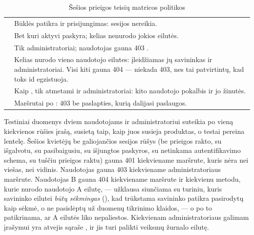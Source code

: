 \begin{table}[H]
\caption{Šešios prieigos teisių matricos politikos}\label{tab:testing:policies}
\begin{tabularx}{\textwidth}{@{}L{21mm}Y@{}}
\toprule
{} &  \\
\midrule
{} & Būklės patikra ir prisijungimas: sesijos nereikia. \\
 & Bet kuri aktyvi paskyra; kelias nenurodo jokios eilutės. \\
 & Tik administratoriai; naudotojas gauna 403 . \\
 & Kelias nurodo vieno naudotojo eilutes: įleidžiamas jų savininkas ir
administratoriai. Visi kiti gauna 404 --- niekada 403, nes tai patvirtintų, kad toks id
egzistuoja. \\
 & Kaip , tik atmetami ir administratoriai: kito naudotojo
pokalbis ir jo žinutės. \\
 & Maršrutai po : 403  be paslapties,
kurią dalijasi paslaugos. \\
\bottomrule
\end{tabularx}
\end{table}

Testiniai duomenys dviem naudotojams ir administratoriui suteikia po vieną kiekvienos rūšies
įrašą, susietą taip, kaip juos susieja produktas, o testai pereina lentelę. Šešios kvietėjų be
galiojančios sesijos rūšys (be prieigos rakto, su išgalvotu, su pasibaigusiu, su išjungtos
paskyros, su netinkama autentifikavimo schema, su tuščiu prieigos raktu) gauna 401 kiekviename maršrute, kuris
nėra nei viešas, nei vidinis. Naudotojas gauna 403 kiekviename administratoriaus maršrute.
Naudotojas B gauna 404 kiekviename maršrute ir kiekvienu metodu, kurie nurodo naudotojo A eilutę, ---
užklausa siunčiama su turiniu, kuris savininko eilutei \emph{būtų sėkmingas}
(), kad trūkstama savininko patikra pasirodytų kaip sėkmė, o ne pasislėptų
už duomenų tikrinimo klaidos, --- o po to patikrinama, ar A eilutės liko nepaliestos. Kiekvienam
administratoriaus galimam įrašymui yra atvejis sąraše , ir jis turi palikti veiksmų
žurnalo eilutę.

